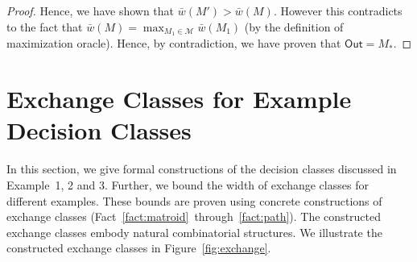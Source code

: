 \documentclass{article}
\newcommand{\M}{\mathcal M}
\newcommand{\out}{\mathsf{Out}}
\begin{document}
\begin{proof}
Hence, we have shown that $\bar w(M') > \bar w(M)$. 
However this contradicts to the fact that $\bar w(M)=\max_{M_1\in \M} \bar w(M_1)$ (by the definition of maximization oracle). 
Hence, by contradiction, we have proven that $\out=M_*$.
\end{proof}



\section{Exchange Classes for Example Decision Classes}
\label{section:exchange-proof}

In this section, we give formal constructions of the decision classes discussed in Example~1, 2 and 3.
Further, we bound the width of exchange classes for different examples.
These bounds are proven using concrete constructions of exchange classes (Fact~\ref{fact:matroid}~through~\ref{fact:path}).
The constructed exchange classes embody natural combinatorial structures.
We illustrate the constructed exchange classes in Figure~\ref{fig:exchange}.
\end{document}
